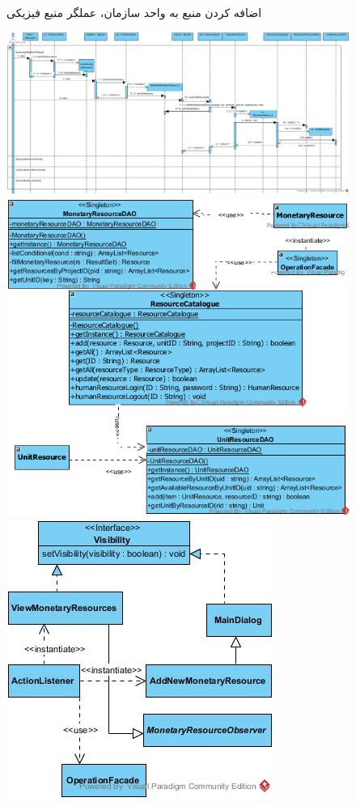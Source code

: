 \begin{landscape}
\begin{figure}[H]
	\caption{اضافه کردن منبع به واحد سازمان، عملگر منبع فیزیکی}
\end{figure}
\begin{figure}[H]
	\centering
	\includegraphics[scale=0.5]{img/sequence-design/AddResourceToUnit_MONETARY}
	\includegraphics[scale=0.5]{img/sequence-design/AddResourceToUnit_MONETARYC}
	\includegraphics[scale=0.5]{img/sequence-design/AddResourceToUnit_MONETARYUI}

\end{figure}
\end{landscape}
